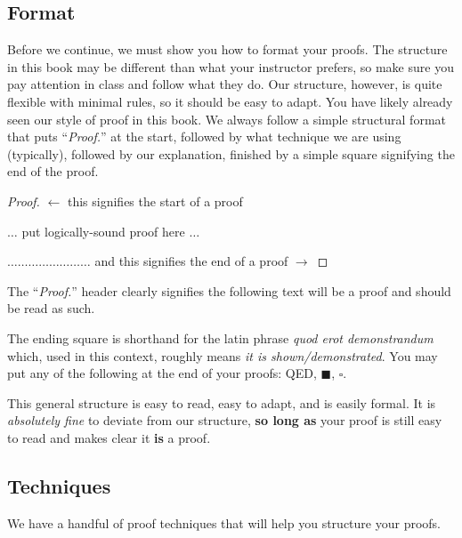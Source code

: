 \documentclass[main.tex]{subfiles}
\begin{document}
\subsection{Format}

Before we continue, we must show you how to format your proofs. The structure in this book may be different than what your instructor prefers, so make sure you pay attention in class and follow what they do. Our structure, however, is quite flexible with minimal rules, so it should be easy to adapt. You have likely already seen our style of proof in this book. We always follow a simple structural format that puts ``\textit{Proof.}'' at the start, followed by what technique we are using (typically), followed by our explanation, finished by a simple square signifying the end of the proof.

\begin{proof}
	\(\leftarrow\) this signifies the start of a proof
	
	\vspace{2em}
	
	\begin{center}
		\(\dots\) put logically-sound proof here \(\dots\)
	\end{center}
	
	\vspace{2em}
	
	\hfill \(\dots \dots \dots \dots \dots \dots \dots \dots \) and this signifies the end of a proof \(\rightarrow\)
\end{proof}

The ``\textit{Proof.}'' header clearly signifies the following text will be a proof and should be read as such.

The ending square is shorthand for the latin phrase \textit{quod erot demonstrandum} which, used in this context, roughly means \textit{it is shown/demonstrated}. You may put any of the following at the end of your proofs: QED, \(\blacksquare\), \(\square\).

This general structure is easy to read, easy to adapt, and is easily formal. It is \textit{absolutely fine} to deviate from our structure, \textbf{so long as} your proof is still easy to read and makes clear it \textbf{is} a proof.

\subsection{Techniques}

We have a handful of proof techniques that will help you structure your proofs.
\end{document}
